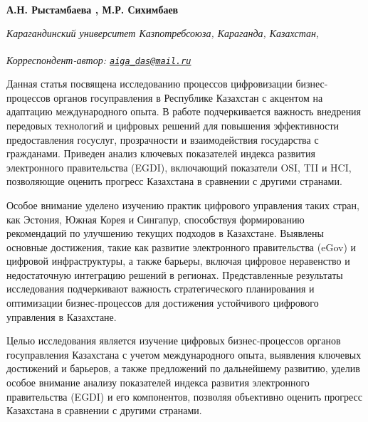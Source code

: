
\begin{articleheader}

{\bfseries  
А.Н. Рыстамбаева\textsuperscript{\envelope } ,
М.Р. Сихимбаев}
\end{articleheader}

\begin{affiliation}
\emph{Карагандинский университет Казпотребсоюза, Караганда, Казахстан,}

\raggedright \textsuperscript{\envelope }{\em Корреспондент-автор: \href{mailto:aiga_das@mail.ru}{\nolinkurl{aiga\_das@mail.ru}}}
\end{affiliation}

Данная статья посвящена исследованию процессов цифровизации
бизнес-процессов органов госуправления в Республике Казахстан с акцентом
на адаптацию международного опыта. В работе подчеркивается важность
внедрения передовых технологий и цифровых решений для повышения
эффективности предоставления госуслуг, прозрачности и взаимодействия
государства с гражданами. Приведен анализ ключевых показателей индекса
развития электронного правительства (EGDI), включающий показатели OSI,
TII и HCI, позволяющие оценить прогресс Казахстана в сравнении с другими
странами.

Особое внимание уделено изучению практик цифрового управления таких
стран, как Эстония, Южная Корея и Сингапур, способствуя формированию
рекомендаций по улучшению текущих подходов в Казахстане. Выявлены
основные достижения, такие как развитие электронного правительства
(eGov) и цифровой инфраструктуры, а также барьеры, включая цифровое
неравенство и недостаточную интеграцию решений в регионах.
Представленные результаты исследования подчеркивают важность
стратегического планирования и оптимизации бизнес-процессов для
достижения устойчивого цифрового управления в Казахстане.

Целью исследования является изучение цифровых бизнес-процессов органов
госуправления Казахстана с учетом международного опыта, выявления
ключевых достижений и барьеров, а также предложений по дальнейшему
развитию, уделив особое внимание анализу показателей индекса развития
электронного правительства (EGDI) и его компонентов, позволяя объективно
оценить прогресс Казахстана в сравнении с другими странами.

